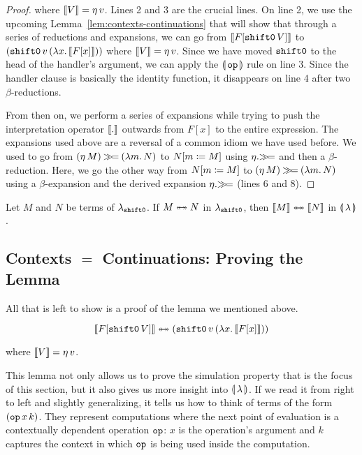 \begin{proof}
where $\llbracket V \rrbracket = \eta\,v$. Lines 2 and 3 are the crucial lines. On
line 2, we use the upcoming Lemma~\ref{lem:contexts-continuations} that
will show that through a series of reductions and expansions, we can go
from $\llbracket F[\mathtt{shift0}\,V] \rrbracket$ to
$(\mathtt{shift0}\,v\,(\lambda x.\, \llbracket F[x] \rrbracket))$ where $\llbracket V \rrbracket =
\eta\,v$. Since we have moved $\mathtt{shift0}$ to the head of the
handler's argument, we can apply the $\llparenthesis \, \mathtt{op} \, \rrparenthesis$ rule on line
3. Since the handler clause is basically the identity function, it
disappears on line 4 after two $\beta$-reductions.

From then on, we perform a series of expansions while trying to push the
interpretation operator $\llbracket . \rrbracket$ outwards from $F[x]$ to the entire
expression. The expansions used above are a reversal of a common idiom we
have used before. We used to go from $(\eta\,M) \mathbin{\gg\!=} (\lambda m.\, N)$
to $N[m \coloneqq M]$ using $\eta.\mathbin{\gg\!=}$ and then a
$\beta$-reduction. Here, we go the other way from $N[m \coloneqq M]$ to
$(\eta\,M) \mathbin{\gg\!=} (\lambda m.\, N)$ using a $\beta$-expansion and the
derived expansion $\eta.\mathbin{\gg\!=}$ (lines 6 and 8).
\end{proof}

\begin{corollary}
  \label{coro:simul-sem}
  Let $M$ and $N$ be terms of $\lambda_{\mathtt{shift0}}$. If $M \twoheadleftarrow \mathrel{\mkern-15mu} \twoheadrightarrow N$ in
  $\lambda_{\mathtt{shift0}}$, then $\llbracket M \rrbracket \twoheadleftarrow \mathrel{\mkern-15mu} \twoheadrightarrow \llbracket N \rrbracket$ in
  $\llparenthesis \, \lambda \, \rrparenthesis$.
\end{corollary}


\subsection*{Contexts $=$ Continuations: Proving the Lemma}

All that is left to show is a proof of the lemma we mentioned above.

\begin{lemma}
\label{lem:contexts-continuations}
$$
\llbracket F[\mathtt{shift0}\,V] \rrbracket \twoheadleftarrow \mathrel{\mkern-15mu} \twoheadrightarrow (\mathtt{shift0}\,v\,(\lambda x.\, \llbracket F[x] \rrbracket))
$$

where $\llbracket V \rrbracket = \eta\,v$. 
\end{lemma}

This lemma not only allows us to prove the simulation property that is the
focus of this section, but it also gives us more insight into
$\llparenthesis \, \lambda \, \rrparenthesis$. If we read it from right to left and slightly
generalizing, it tells us how to think of terms of the form
$(\mathtt{op}\,x\,k)$. They represent computations where the next point
of evaluation is a contextually dependent operation $\mathtt{op}$: $x$ is the
operation's argument and $k$ captures the context in which $\mathtt{op}$ is
being used inside the computation.

